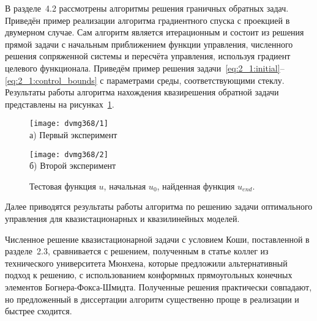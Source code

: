 В разделе~4.2 рассмотрены алгоритмы решения граничных обратных задач.
Приведён пример реализации алгоритма градиентного спуска с проекцией в двумерном случае.
Сам алгоритм является итерационным и состоит из решения прямой
задачи с начальным приближением функции управления,
численного решения сопряженной системы и пересчёта управления,
используя градиент целевого функционала.
Приведём пример решения задачи~\eqref{eq:2_1:initial}--\eqref{eq:2_1:control_bounds}
с параметрами среды, соответствующими стеклу.
Результаты работы алгоритма нахождения квазирешения обратной задачи
представлены на рисунках~\ref{fig:4_3:control}.
\begin{figure}[h!t]
    \begin{minipage}[b][][b]{0.49\linewidth}
        \centering
        \texttt{[image: dvmg368/1]} \\ а) Первый эксперимент
    \end{minipage}
    \hfill
    \begin{minipage}[b][][b]{0.49\linewidth}
        \centering
        \texttt{[image: dvmg368/2]} \\ б) Второй эксперимент
    \end{minipage}
    \caption{Тестовая функция $u$, начальная $u_0$, найденная функция $u_{end}$.}
    \label{fig:4_3:control}
\end{figure}

Далее приводятся результаты работы алгоритма по решению задачи оптимального
управления для квазистационарных и квазилинейных моделей.


Численное решение квазистационарной задачи с условием Коши, поставленной в разделе~2.3,
сравнивается с решением, полученным в статье коллег из технического университета Мюнхена,
которые предложили альтернативный подход к решению, с использованием
конформных прямоугольных конечных элементов
Богнера-Фокса-Шмидта.
Полученные решения практически совпадают, но предложенный в диссертации алгоритм
существенно проще в реализации и быстрее сходится.


